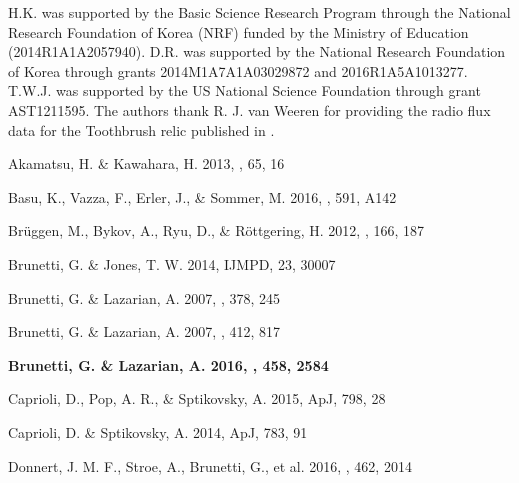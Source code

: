 \documentclass[twocolumn]{aastex61}
\begin{document}
\acknowledgements
H.K. was supported by the Basic Science Research Program through the National Research Foundation of Korea (NRF) funded by the Ministry of Education (2014R1A1A2057940).
D.R. was supported by the National Research Foundation of Korea through grants 2014M1A7A1A03029872 and 2016R1A5A1013277.
T.W.J. was supported by the US National Science Foundation through grant AST1211595.
The authors thank R. J. van Weeren for providing the radio flux data for the Toothbrush relic
published in \citet{vanweeren16}.


\begin{thebibliography}{}

Akamatsu, H. \& Kawahara, H. 2013, 
\pasj, 65, 16

Basu, K., Vazza, F., Erler, J., \& Sommer, M. 2016,
\aap, 591, A142

Br\"uggen, M., Bykov, A., Ryu, D., \& R\"ottgering, H. 2012, 
\ssr, 166, 187

Brunetti, G. \& Jones, T. W. 2014, 
IJMPD, 23, 30007

Brunetti, G. \& Lazarian, A. 2007, 
\mnras, 378, 245

Brunetti, G. \& Lazarian, A. 2007, 
\mnras, 412, 817

{\bf Brunetti, G. \& Lazarian, A. 2016,
\mnras, 458, 2584}

Caprioli, D., Pop, A. R., \& Sptikovsky, A. 2015,
ApJ, 798, 28

Caprioli, D. \& Sptikovsky, A. 2014,
ApJ, 783, 91

Donnert, J. M. F., Stroe, A., Brunetti, G., et al. 2016,
\mnras, 462, 2014


\end{thebibliography}
\end{document}
